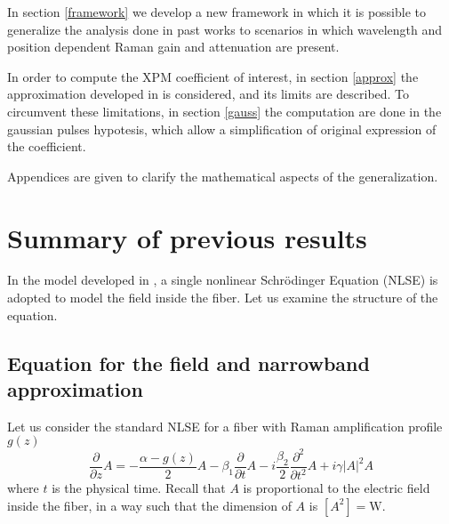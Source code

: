 \documentclass[10pt, lettersize, journal, onecolumn]{IEEEtran}
\begin{document}
In section \ref{framework} we develop a new framework in which it is possible to generalize the analysis done in past works to scenarios in which wavelength and position dependent Raman gain and attenuation are present.


In order to compute the XPM coefficient of interest, in section \ref{approx} the approximation developed in \cite{Dar_2013} is considered, and its limits are described.
To circumvent these limitations, in section \ref{gauss} the computation are done in the gaussian pulses hypotesis, which allow a simplification of original expression of the coefficient.

Appendices are given to clarify the mathematical aspects of the generalization.


\section{Summary of previous results}\label{previous}
In the model developed in \cite{Dar_2013}, a single nonlinear Schrödinger Equation (NLSE) is adopted to model the field inside the fiber. Let us examine the structure of the equation.
\subsection{Equation for the field and narrowband approximation}
    Let us consider the standard NLSE for a fiber with Raman amplification profile $g(z)$
    \begin{equation}\label{eq:nlse}
        \frac{\partial}{\partial z} A = -\frac{\alpha - g(z)}{2}A - \beta_1 \frac{\partial}{\partial t} A - i \frac{\beta_2}{2} \frac{\partial^2}{\partial t^2} A + i \gamma |A|^2 A
    \end{equation}
    where $t$ is the physical time. Recall that $A$ is proportional to the electric field inside the fiber, in a way such that the dimension of $A$ is $[A^2] = \text{W}$.
\end{document}
